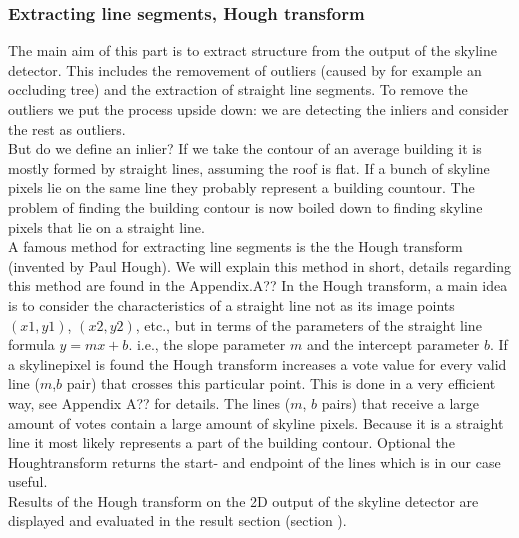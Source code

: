 \documentclass[10pt]{article}
\begin{document}
\subsubsection{Extracting line segments, Hough transform} %

	The main aim of this part is to extract structure from the output of the skyline detector. This includes the removement of outliers (caused by for example an occluding tree) and the extraction of straight line segments. 
	To remove the outliers we put the process upside down: we are detecting the inliers and consider the rest as outliers.\\
	But do we define an inlier? If we take the contour of an average building it is mostly formed by straight lines, assuming the roof is flat.
	If a bunch of skyline pixels lie on the same line they probably represent a building countour.
	The problem of finding the building contour is now boiled down to finding skyline pixels that lie on a straight line.
	\\
	A famous method for extracting line segments is the the Hough transform (invented by Paul Hough).
	We will explain this method in short, details regarding this method are found in the Appendix.A??%
	In the Hough transform, a main idea is to consider the characteristics of a straight line not as its image points $(x1, y1)$, $(x2, y2)$, etc., but in terms of the parameters of the straight line formula $y = mx + b$. i.e., the slope parameter $m$ and the intercept parameter $b$.
	If a skylinepixel is found the Hough transform increases a vote value for every valid line ($m$,$b$ pair) that crosses this particular point. This is done in a very efficient way, see Appendix A?? %
	for details.
	The lines ($m$, $b$ pairs) that receive a large amount of votes contain a large amount of skyline pixels. Because it is a straight line it most likely represents a part of the building contour. 
	Optional the Houghtransform returns the start- and endpoint of the lines which is in our case useful. 
	\\
	Results of the Hough transform on the 2D output of the skyline detector are displayed and evaluated in the result section (section %
	).
\end{document}
